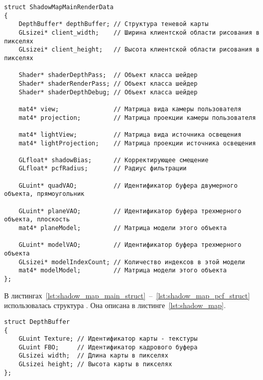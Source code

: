 \begin{center}
\captionsetup{justification=centering, singlelinecheck=off}
\begin{lstlisting}[label=lst:shadow_map_pcf_struct, caption={Структура параметров для алгоритмов теневых карт с фильтрацией}]
struct ShadowMapMainRenderData
{
    DepthBuffer* depthBuffer; // Структура теневой карты
    GLsizei* client_width;    // Ширина клиентской области рисования в пикселях
    GLsizei* client_height;   // Высота клиентской области рисования в пикселях

    Shader* shaderDepthPass;  // Объект класса шейдер
    Shader* shaderRenderPass; // Объект класса шейдер
    Shader* shaderDepthDebug; // Объект класса шейдер

    mat4* view;               // Матрица вида камеры пользователя
    mat4* projection;         // Матрица проекции камеры пользователя

    mat4* lightView;          // Матрица вида источника освещения
    mat4* lightProjection;    // Матрица проекции источника освещения

    GLfloat* shadowBias;      // Корректирующее смещение
    GLfloat* pcfRadius;       // Радиус фильтрации

    GLuint* quadVAO;          // Идентификатор буфера двумерного объекта, прямоугольник

    GLuint* planeVAO;         // Идентификатор буфера трехмерного объекта, плоскость
    mat4* planeModel;         // Матрица модели этого объекта

    GLuint* modelVAO;         // Идентификатор буфера трехмерного объекта
    GLsizei* modelIndexCount; // Количество индексов в этой модели
    mat4* modelModel;         // Матрица модели этого объекта
};
\end{lstlisting}
\end{center}

В листингах~\ref{lst:shadow_map_main_struct}~--~\ref{lst:shadow_map_pcf_struct}
использовалась структура . Она описана в
листинге~\ref{lst:shadow_map}.

\begin{center}
\captionsetup{justification=centering, singlelinecheck=off}
\begin{lstlisting}[label=lst:shadow_map, caption={Структура теневой карты}]
struct DepthBuffer
{
    GLuint Texture; // Идентификатор карты - текстуры
    GLuint FBO;     // Идентификатор кадрового буфера
    GLsizei width;  // Длина карты в пикселях
    GLsizei height; // Высота карты в пикселях
};
\end{lstlisting}
\end{center}

